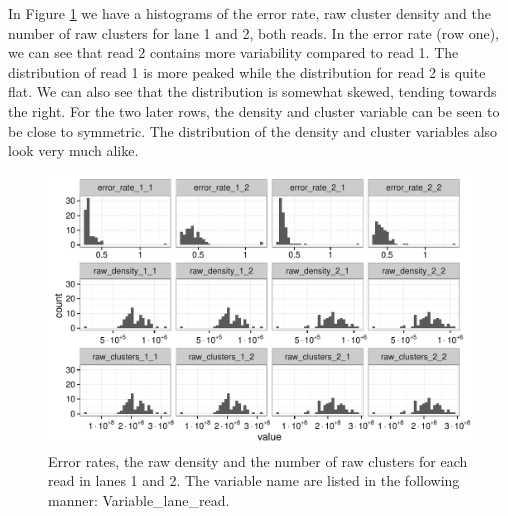 \documentclass[a4paper,11pt,fleqn,twoside,notitlepage]{report}\usepackage[]{graphicx}\usepackage[]{color}
\makeatletter
\def\maxwidth{ %
  \ifdim\Gin@nat@width>\linewidth
    \linewidth
  \else
    \Gin@nat@width
  \fi
}
\newenvironment{knitrout}{}{} %
\makeatother
\begin{document}
In Figure \ref{fig:ReadlvlER} we have a histograms of the error rate, raw cluster density and the number of raw clusters for lane 1 and 2, both reads. In the error rate (row one), we can see that read 2 contains more variability compared to read 1. The distribution of read 1 is more peaked while the distribution for read 2 is quite flat. We can also see that the distribution is somewhat skewed, tending towards the right. For the two later rows, the density and cluster variable can be seen to be close to symmetric. The distribution of the density and cluster variables also look very much alike. 
\begin{knitrout}
\color{fgcolor}\begin{figure}[!htb]
\includegraphics[width=\maxwidth]{figure/ReadlvlER-1} \caption[Error rates, the raw density and the number of raw clusters for each read in lanes 1 and 2]{Error rates, the raw density and the number of raw clusters for each read in lanes 1 and 2. The variable name are listed in the following manner: Variable\_lane\_read.}\label{fig:ReadlvlER}
\end{figure}


\end{knitrout}
\end{document}
